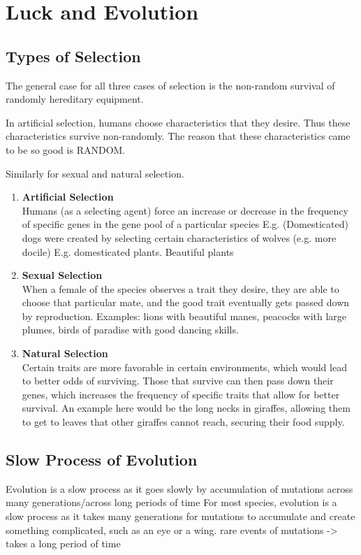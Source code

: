 \documentclass[11pt]{article}
\begin{document}
\tableofcontents

\section{Luck and Evolution}
\subsection{Types of Selection}
The general case for all three cases of selection is the non-random survival of randomly hereditary equipment.

In artificial selection, humans  choose characteristics that they desire.  Thus these characteristics survive non-randomly.  The reason that these characteristics came to be so good is 	RANDOM.

Similarly for sexual and natural selection.

\begin{enumerate}
 \item {
       \textbf{Artificial Selection}
       \\ Humans (as a selecting agent) force an increase or decrease in the frequency of specific genes in the gene pool of a particular species
       E.g. (Domesticated) dogs were created by selecting certain characteristics of wolves (e.g. more docile)
       E.g. domesticated plants.
       Beautiful plants
       }
 \item {
       \textbf{Sexual Selection}
       \\ When a female of the species observes a trait they desire, they are able to choose that particular mate, and the good trait eventually gets passed down by reproduction.
       Examples: lions with beautiful manes, peacocks with large plumes, birds of paradise with good dancing skills.
       }
 \item  {
       \textbf{Natural Selection}
       \\ Certain traits are more favorable in certain environments, which would lead to better odds of surviving. Those that survive can then pass down their genes, which increases the frequency of specific traits that allow for better survival.
       An example here would be the long necks in giraffes, allowing them to get to leaves that other giraffes cannot reach, securing their food supply.
       }
\end{enumerate}
\subsection{Slow Process of Evolution}
Evolution is a slow process as it goes slowly by accumulation of mutations across many generations/across long periods of time
For most species, evolution is a slow process as it takes many generations for mutations to accumulate and create something complicated, such as an eye or a wing.  rare events of mutations -> takes a long period of time
\end{document}
